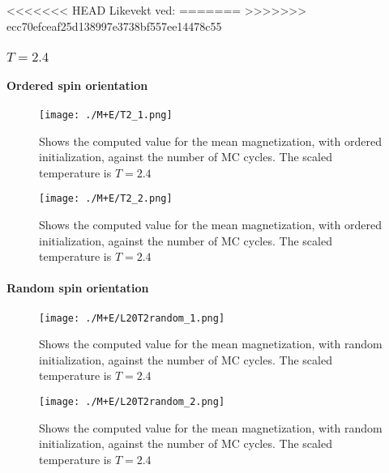 \documentclass[../main.tex]{subfiles}
\begin{document}
<<<<<<< HEAD
Likevekt ved:
=======
>>>>>>> ecc70efceaf25d138997e3738bf557ee14478c55

\subsubsection*{$T=2.4$}
\paragraph*{Ordered spin orientation}

\begin{figure}[!h]
  \texttt{[image: ./M+E/T2\_1.png]}
  \caption{Shows the computed value for the mean magnetization, with ordered initialization, against the number of MC cycles. The scaled temperature is $T=2.4$}
  \label{fig:results-MCplot}
\end{figure}
\FloatBarrier
\begin{figure}[!h]
  \texttt{[image: ./M+E/T2\_2.png]}
  \caption{Shows the computed value for the mean magnetization, with ordered initialization, against the number of MC cycles. The scaled temperature is $T=2.4$}
  \label{fig:results-MCplot}
\end{figure}
\FloatBarrier

\paragraph*{Random spin orientation}

\begin{figure}[!h]
  \texttt{[image: ./M+E/L20T2random\_1.png]}
  \caption{Shows the computed value for the mean magnetization, with random initialization, against the number of MC cycles. The scaled temperature is $T=2.4$}
  \label{fig:results-MCplot}
\end{figure}
\FloatBarrier
\begin{figure}[!h]
  \texttt{[image: ./M+E/L20T2random\_2.png]}
  \caption{Shows the computed value for the mean magnetization, with random initialization, against the number of MC cycles. The scaled temperature is $T=2.4$}
  \label{fig:results-MCplot}
\end{figure}
\FloatBarrier
\end{document}
